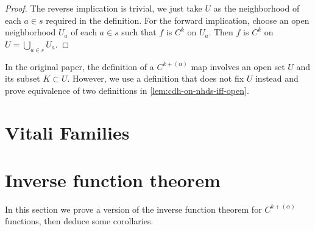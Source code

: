\begin{proof}
  The reverse implication is trivial, we just take \(U\) as the neighborhood of each \(a \in s\) required in the definition.
  For the forward implication, choose an open neighborhood \(U_{a}\) of each \(a \in s\) such that \(f\) is \(C^{k}\) on \(U_{a}\).
  Then \(f\) is \(C^{k}\) on \(U = \bigcup_{a \in s} U_{a}\).
\end{proof}

\begin{remark}
  In the original paper, the definition of a \(C^{k+(\alpha)}\) map
  involves an open set \(U\) and its subset \(K\subset U\).
  However, we use a definition that does not fix \(U\) instead
  and prove equivalence of two definitions in \autoref{lem:cdh-on-nhds-iff-open}.
\end{remark}

\section{Vitali Families}%
\label{sec:vitali-families}

\section{Inverse function theorem}%
\label{sec:inverse-funct-theor}

In this section we prove a version of the inverse function theorem for \(C^{k+(\alpha)}\) functions,
then deduce some corollaries.

